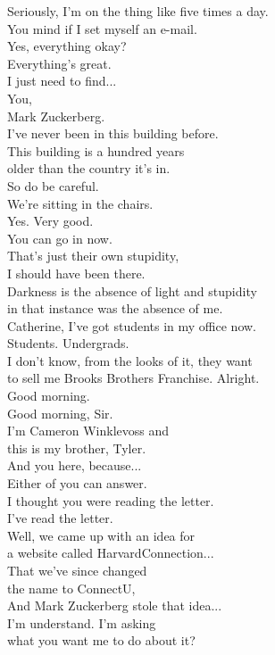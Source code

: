 \documentclass{article}
\begin{document}
\begin{multicols}{3}
Seriously, I'm on the thing like five times a day.\\
You mind if I set myself an e-mail.\\
Yes, everything okay?\\
Everything's great.\\
I just need to find...\\
You,\\
Mark Zuckerberg.\\
I've never been in this building before.\\
This building is a hundred years\\
older than the country it's in.\\
So do be careful.\\
We're sitting in the chairs.\\
Yes. Very good.\\
You can go in now.\\
That's just their own stupidity,\\
I should have been there.\\
Darkness is the absence of light and stupidity\\
in that instance was the absence of me.\\
Catherine, I've got students in my office now.\\
Students. Undergrads.\\
I don't know, from the looks of it, they want\\
to sell me Brooks Brothers Franchise. Alright.\\
Good morning.\\
Good morning, Sir.\\
I'm Cameron Winklevoss and\\
this is my brother, Tyler.\\
And you here, because...\\
Either of you can answer.\\
I thought you were reading the letter.\\
I've read the letter.\\
Well, we came up with an idea for\\
a website called HarvardConnection...\\
That we've since changed\\
the name to ConnectU,\\
And Mark Zuckerberg stole that idea...\\
I'm understand. I'm asking\\
what you want me to do about it?\\

\end{multicols}
\end{document}
